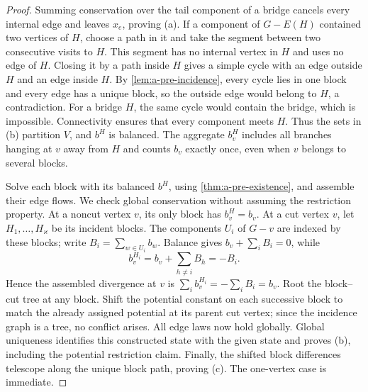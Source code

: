 \begin{proof}
Summing conservation over the tail component of a bridge cancels every
internal edge and leaves $x_e$, proving (a).
If a component of $G-E(H)$ contained two vertices of $H$, choose a
path in it and take the segment between two consecutive visits to $H$.
This segment has no internal vertex in $H$ and uses no edge of $H$.
Closing it by a path inside $H$ gives a simple cycle with an edge
outside $H$ and an edge inside $H$. By \cref{lem:a-pre-incidence},
every cycle lies in one block and every edge has a unique block, so
the outside edge would belong to $H$, a contradiction. For a bridge
$H$, the same cycle would contain the bridge, which is impossible.
Connectivity ensures that every component meets $H$. Thus the sets
in (b) partition $V$, and $b^H$ is balanced. The aggregate $b^H_v$
includes all branches hanging at $v$ away from $H$ and counts $b_v$
exactly once, even when $v$ belongs to several blocks.

Solve each block with its balanced $b^H$, using
\cref{thm:a-pre-existence}, and assemble their edge flows. We check
global conservation without assuming the restriction property. At a
noncut vertex $v$, its only block has $b^H_v=b_v$. At a cut vertex $v$,
let $H_1,\ldots,H_\varkappa$ be its incident blocks. The components $U_i$ of
$G-v$ are indexed by these blocks; write $B_i=\sum_{w\in U_i}b_w$.
Balance gives $b_v+\sum_i B_i=0$, while
\[
 b^{H_i}_v=b_v+\sum_{h\ne i}B_h=-B_i.
\]
Hence the assembled divergence at $v$ is
$\sum_i b^{H_i}_v=-\sum_i B_i=b_v$.
Root the block--cut tree at any block. Shift the potential constant on
each successive block to match the already assigned potential at its
parent cut vertex; since the incidence graph is a tree, no conflict
arises. All edge laws now hold globally. Global uniqueness identifies
this constructed state with the given state and proves (b), including
the potential restriction claim.
Finally, the shifted block differences telescope along the unique
block path, proving (c). The one-vertex case is immediate.
\end{proof}


